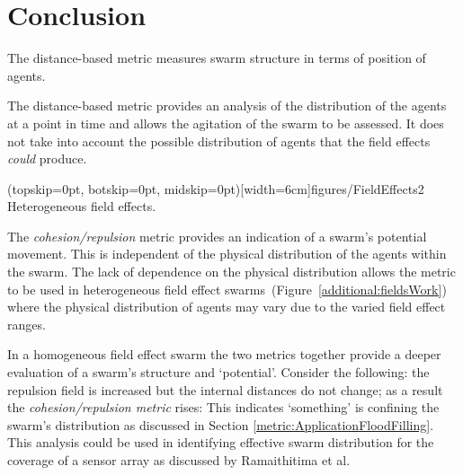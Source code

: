 \documentclass{ieeeaccess}
\begin{document}

\section{Conclusion\label{metric:MagnitudeDistanceComparison}}
The distance-based metric measures swarm structure in terms of position of agents.

The distance-based metric provides an analysis of the distribution of the agents at a point in time and allows the agitation of the swarm to be assessed. It does not take into account the possible distribution of agents that the field effects \emph{could} produce.

\Figure[t!](topskip=0pt, botskip=0pt, midskip=0pt)[width=6cm]{figures/FieldEffects2}
{Heterogeneous field effects.\label{additional:fieldsWork}}

The \emph{cohesion/repulsion} metric provides an indication of a swarm's potential movement. This is independent of the physical distribution of the agents within the swarm. The lack of dependence on the physical distribution allows the metric to be used in heterogeneous field effect swarms~(Figure~\ref{additional:fieldsWork}) where the physical distribution of agents may vary due to the varied field effect ranges. 

In a homogeneous field effect swarm the two metrics together provide a deeper evaluation of a swarm's structure and `potential'. Consider the following: the repulsion field is increased but the internal distances do not change; as a result the \emph{cohesion/repulsion metric} rises: This indicates `something' is confining the swarm's distribution as discussed in Section \ref{metric:ApplicationFloodFilling}. This analysis could be used in identifying effective swarm distribution for the coverage of a sensor array as discussed by Ramaithitima et al.~\cite{RWBK:15}
\end{document}
